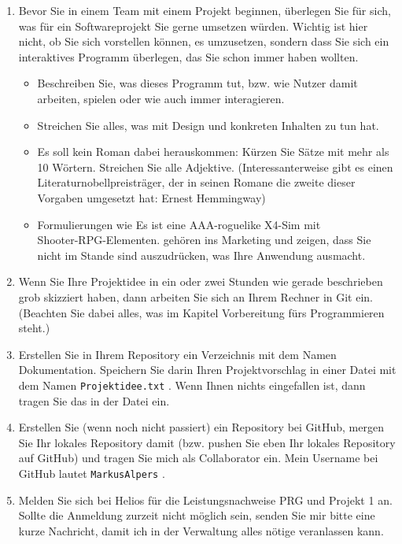 \begin{enumerate}
	\item Bevor Sie in einem Team mit einem Projekt beginnen, überlegen Sie für sich, was für ein Softwareprojekt Sie gerne umsetzen würden. Wichtig ist hier nicht, ob Sie sich vorstellen können, es umzusetzen, sondern dass Sie sich ein interaktives Programm überlegen, das Sie schon immer haben wollten.
	\begin{itemize}
		\item Beschreiben Sie, was dieses Programm tut, bzw. wie Nutzer damit arbeiten, spielen oder wie auch immer interagieren.
		\item Streichen Sie alles, was mit Design und konkreten Inhalten zu tun hat.
		\item Es soll kein Roman dabei herauskommen: Kürzen Sie Sätze mit mehr als 10 Wörtern. Streichen Sie alle Adjektive. (Interessanterweise gibt es einen Literaturnobellpreisträger, der in seinen Romane die zweite dieser Vorgaben umgesetzt hat: Ernest Hemmingway)
		\item Formulierungen wie \glqq{}Es ist eine AAA-roguelike X4-Sim mit\\ Shooter-RPG-Elementen.\grqq{} gehören ins Marketing und zeigen, dass Sie nicht im Stande sind auszudrücken, was Ihre Anwendung ausmacht. 
	\end{itemize}
	\item Wenn Sie Ihre Projektidee in ein oder zwei Stunden wie gerade beschrieben grob skizziert haben, dann arbeiten Sie sich an Ihrem Rechner in Git ein. (Beachten Sie dabei alles, was im Kapitel \glqq{}Vorbereitung fürs Programmieren\grqq{} steht.)
	\item Erstellen Sie in Ihrem Repository ein Verzeichnis mit dem Namen Dokumentation. Speichern Sie darin Ihren Projektvorschlag in einer Datei mit dem Namen \verb|Projektidee.txt| . Wenn Ihnen nichts eingefallen ist, dann tragen Sie das in der Datei ein.
	\item Erstellen Sie (wenn noch nicht passiert) ein Repository bei GitHub, mergen Sie Ihr lokales Repository damit (bzw. pushen Sie eben Ihr lokales Repository auf GitHub) und tragen Sie mich als Collaborator ein. Mein Username bei GitHub lautet \verb|MarkusAlpers| .
	\item Melden Sie sich bei Helios für die Leistungsnachweise PRG und Projekt 1 an.\\
	Sollte die Anmeldung zurzeit nicht möglich sein, senden Sie mir bitte eine kurze Nachricht, damit ich in der Verwaltung alles nötige veranlassen kann.

\end{enumerate}
